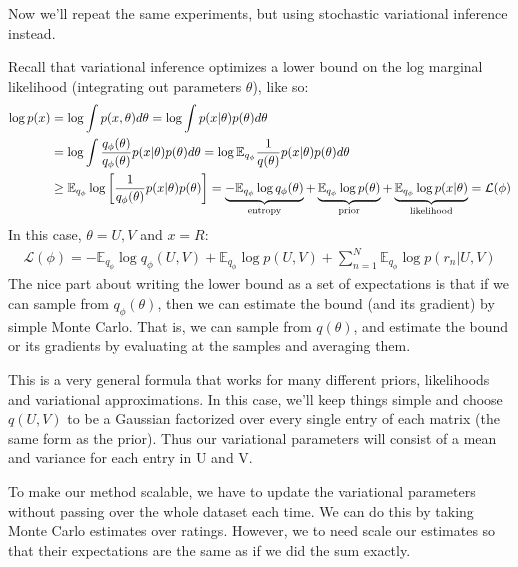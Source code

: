 \documentclass{harvardml}
\theoremstyle{plain}
\begin{document}
\begin{problem}

Now we'll repeat the same experiments, but using stochastic variational inference instead.

Recall that variational inference optimizes a lower bound on the log marginal likelihood (integrating out parameters $\theta$), like so:
\begin{align}
\log p(x) & = \log \int p(x, \theta) d\theta = \log \int p(x|\theta) p(\theta) d\theta \\
& = \log \int \frac{q_\phi(\theta)}{q_\phi(\theta)} p(x|\theta) p(\theta) d\theta
  = \log \mathbb{E}_{q_\phi} \frac{1}{q(\theta)} p(x|\theta) p(\theta) d\theta \\
& \geq \mathbb{E}_{q_\phi} \log \left[ \frac{1}{q_\phi(\theta)} p(x|\theta) p(\theta) \right]
 = \underbrace{-\mathbb{E}_{q_\phi} \log q_\phi(\theta)}_{\textnormal{entropy}}  + \underbrace{\mathbb{E}_{q_\phi} \log p(\theta)}_{\textnormal{prior}} + \underbrace{\mathbb{E}_{q_\phi} \log p(x|\theta)}_{\textnormal{likelihood}}
= \mathcal{L}(\phi)
\end{align}
%
In this case, $\theta = U,V$ and $x = R$:
%
\begin{align}
\mathcal{L}(\phi) = -\mathbb{E}_{q_\phi} \log q_\phi(U, V) + \mathbb{E}_{q_\phi} \log p(U, V) + \sum_{n=1}^N \mathbb{E}_{q_\phi} \log p(r_n | U, V)
\end{align}
%
The nice part about writing the lower bound as a set of expectations is that if we can sample from $q_\phi(\theta)$, then we can estimate the bound (and its gradient) by simple Monte Carlo.
That is, we can sample from $q(\theta)$, and estimate the bound or its gradients by evaluating at the samples and averaging them.

This is a very general formula that works for many different priors, likelihoods and variational approximations.
In this case, we'll keep things simple and choose $q(U,V)$ to be a Gaussian factorized over every single entry of each matrix (the same form as the prior).
Thus our variational parameters will consist of a mean and variance for each entry in U and V.

To make our method scalable, we have to update the variational parameters without passing over the whole dataset each time.
We can do this by taking Monte Carlo estimates over ratings.
However, we to need scale our estimates so that their expectations are the same as if we did the sum exactly.



\end{problem}
\end{document}

